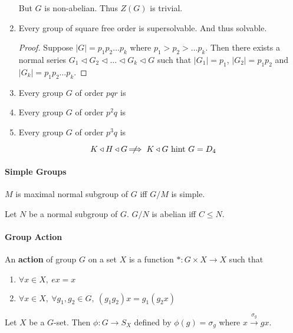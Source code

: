 \begin{enumerate}
		But $G$ is non-abelian. Thus $Z(G)$ is trivial.
	\item Every group of square free order is supersolvable. And thus solvable.
		\begin{proof}
			Suppose $|G| = p_1 p_2 \dots p_k$ where $p_1 > p_2 > \dots p_k$. Then there exists a normal series $G_1 \triangleleft G_2 \triangleleft \dots \triangleleft G_k \triangleleft G$ such that $|G_1| = p_1$, $|G_2| = p_1p_2$ and $|G_k|=p_1p_2\dots p_k$.
		\end{proof}
	\item Every group $G$ of order $pqr$ is
	\item Every group $G$ of order $p^2q$ is 
	\item Every group $G$ of order $p^3q$ is 
\end{enumerate}

$$K \triangleleft H \triangleleft G \;\not\nobreak\!\!\!\!\implies K \triangleleft G \text{ hint } G = D_4$$

\paragraph{Simple Groups}
\begin{theorem}
	$M$ is maximal normal subgroup of $G$ iff $G/M$ is simple.
\end{theorem}

\begin{theorem}
	Let $N$ be a normal subgroup of $G$.
	$G/N$ is abelian iff $C \le N$.
\end{theorem}

\paragraph{Group Action}
\begin{definition}
	An \textbf{action} of group $G$ on a set $X$ is a function $\ast : G \times X \to X$ such that
	\begin{enumerate}
		\item $\forall x \in X,\ ex = x$
		\item $\forall x \in X,\ \forall g_1,g_2 \in G,\ (g_1g_2)x = g_1(g_2x)$
	\end{enumerate}
\end{definition}

\begin{theorem}
	Let $X$ be a $G$-set.
	Then $\phi : G \to S_X$ defined by $\phi(g) = \sigma_g$ where $x \overset{\sigma_g}{\to} gx$.
\end{theorem}

